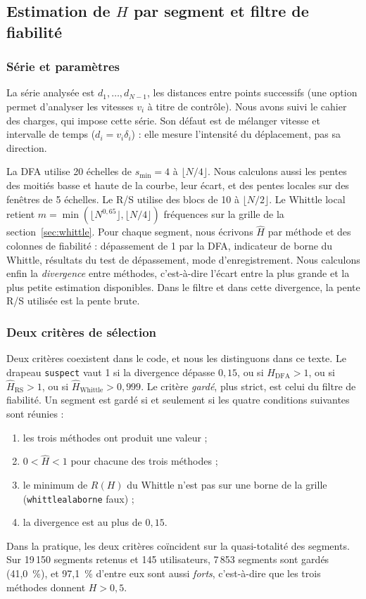 \documentclass[11pt,a4paper]{article}
\newcommand{\code}[1]{\texttt{#1}}
\renewcommand{\_}{\textunderscore\penalty0\hspace{0pt}}
\begin{document}
\subsection{Estimation de $H$ par segment et filtre de fiabilité}
\label{sec:est}

\subsubsection{Série et paramètres}

La série analysée est $d_1,\dots,d_{N-1}$, les distances entre points successifs (une option
permet d'analyser les vitesses $v_i$ à titre de contrôle). Nous avons suivi le cahier des
charges, qui impose cette série. Son défaut est de mélanger vitesse et intervalle de temps
($d_i=v_i\delta_i$) : elle mesure l'intensité du déplacement, pas sa direction.

La DFA utilise 20 échelles de $s_{\min}=4$ à $\lfloor N/4\rfloor$. Nous calculons aussi les
pentes des moitiés basse et haute de la courbe, leur écart, et des pentes locales sur des
fenêtres de 5 échelles. Le R/S utilise des blocs de 10 à $\lfloor N/2\rfloor$. Le Whittle
local retient $m=\min(\lfloor N^{0,65}\rfloor, \lfloor N/4\rfloor)$ fréquences sur la grille
de la section~\ref{sec:whittle}. Pour chaque segment, nous écrivons $\hat H$ par méthode et
des colonnes de fiabilité : dépassement de 1 par la DFA, indicateur de borne du Whittle,
résultats du test de dépassement, mode d'enregistrement. Nous calculons enfin la
\emph{divergence} entre méthodes, c'est-à-dire l'écart entre la plus grande et la plus
petite estimation disponibles. Dans le filtre et dans cette divergence, la pente R/S utilisée
est la pente brute.

\subsubsection{Deux critères de sélection}

Deux critères coexistent dans le code, et nous les distinguons dans ce texte. Le drapeau
\code{suspect} vaut 1 si la divergence dépasse $0{,}15$, ou si $\hat H_{\mathrm{DFA}}>1$, ou
si $\hat H_{\mathrm{RS}}>1$, ou si $\hat H_{\mathrm{Whittle}}>0{,}999$. Le critère
\emph{gardé}, plus strict, est celui du filtre de fiabilité. Un segment est gardé si et
seulement si les quatre conditions suivantes sont réunies :
\begin{enumerate}
  \item les trois méthodes ont produit une valeur ;
  \item $0 < \hat H < 1$ pour chacune des trois méthodes ;
  \item le minimum de $R(H)$ du Whittle n'est pas sur une borne de la grille
  (\code{whittle\_a\_la\_borne} faux) ;
  \item la divergence est au plus de $0{,}15$.
\end{enumerate}
Dans la pratique, les deux critères coïncident sur la quasi-totalité des segments. Sur
19\,150 segments retenus et 145 utilisateurs, 7\,853 segments sont gardés (41,0~\%), et
97,1~\% d'entre eux sont aussi \emph{forts}, c'est-à-dire que les trois méthodes donnent
$H>0{,}5$.
\end{document}
